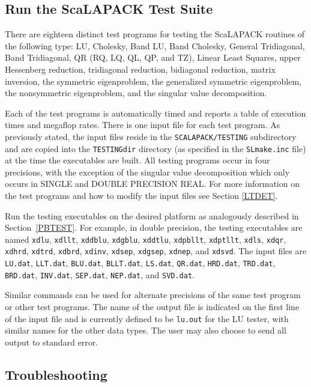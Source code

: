 \documentclass[11pt]{report}
\newcommand{\dent}{\hspace*{\parindent}}
\begin{document}
\subsection{Run the ScaLAPACK Test Suite}
\label{SLTEST}
\dent
There are eighteen distinct test programs for testing the ScaLAPACK
routines of the following type:  LU, Cholesky, Band LU, Band Cholesky,
General Tridiagonal, Band Tridiagonal, QR (RQ, LQ, QL, QP, and TZ), 
Linear Least Squares, upper Hessenberg reduction, tridiagonal reduction,
bidiagonal reduction, matrix inversion, the symmetric eigenproblem,
the generalized symmetric eigenproblem, the nonsymmetric eigenproblem,
and the singular value decomposition.

Each of the test programs is automatically timed
and reports a table of execution times and megaflop rates.
There is one input file for each test program.
As previously stated, the input files reside in the
{\tt SCALAPACK/TESTING} subdirectory and are copied into the
{\tt TESTINGdir} directory (as specified in the {\tt SLmake.inc} file)
at the time the executables are built.  All testing programs occur in
four precisions, with the exception of the singular value decomposition which
only occurs in SINGLE and DOUBLE PRECISION REAL.
For more information on the test programs and how to modify the
input files see Section \ref{LTDET}.

Run the testing executables on the desired platform as analogously
described in Section~\ref{PBTEST}.  For example, in double precision,
the testing executables are named
{\tt xdlu}, {\tt xdllt}, {\tt xddblu}, {\tt xdgblu}, {\tt xddtlu},
{\tt xdpbllt}, {\tt xdptllt}, {\tt xdls}, {\tt xdqr}, {\tt xdhrd},
{\tt xdtrd}, {\tt xdbrd}, {\tt xdinv}, {\tt xdsep}, {\tt xdgsep}, {\tt xdnep},
and {\tt xdsvd}.
The input files are {\tt LU.dat}, {\tt LLT.dat},
{\tt BLU.dat}, {\tt BLLT.dat}, {\tt LS.dat}, {\tt QR.dat},
{\tt HRD.dat}, {\tt TRD.dat}, {\tt BRD.dat}, {\tt INV.dat}, 
{\tt SEP.dat}, {\tt NEP.dat},
and {\tt SVD.dat}. 
 
Similar commands can be used for alternate precisions of the same test
program or other test programs.
The name of the output file is indicated on the first line of the
input file and is currently defined to be {\tt lu.out} for
the LU tester, with similar names for the other data types.  The
user may also choose to send all output to standard error.

\subsection{Troubleshooting}
\end{document}
